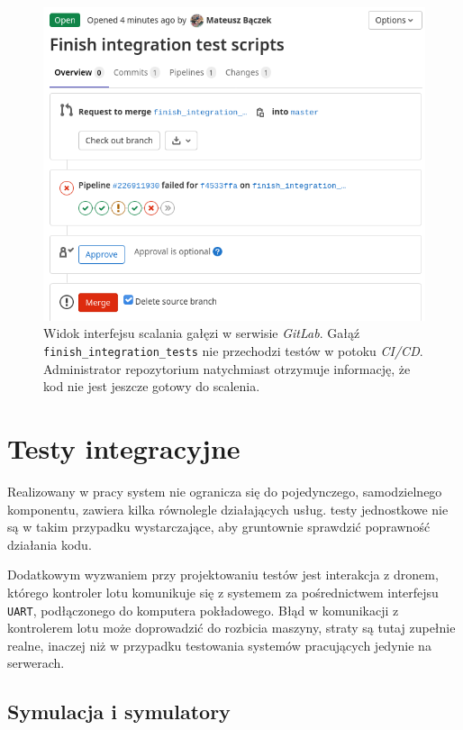 \begin{figure}[H]
	\centering
	\includegraphics[width=0.8\linewidth]{rys05/failed_pipeline.png}
    \caption{
        Widok interfejsu scalania gałęzi w serwisie \textit{GitLab}.
        Gałąź \texttt{finish\_integration\_tests} nie przechodzi testów
        w potoku \textit{CI/CD}. Administrator repozytorium natychmiast
        otrzymuje informację, że kod nie jest jeszcze gotowy do scalenia.
    }
	\label{failed_pipeline}
\end{figure}


\section{Testy integracyjne}

Realizowany w pracy system nie ogranicza się do pojedynczego,
samodzielnego komponentu, zawiera kilka równolegle działających
usług. testy jednostkowe nie są w takim przypadku wystarczające,
aby gruntownie sprawdzić poprawność działania kodu. 

Dodatkowym wyzwaniem przy projektowaniu testów jest interakcja z dronem,
którego kontroler lotu komunikuje się z systemem za pośrednictwem 
interfejsu \texttt{UART}, podłączonego do komputera pokładowego.
Błąd w komunikacji z kontrolerem lotu może doprowadzić do 
rozbicia maszyny, straty są tutaj zupełnie realne, inaczej
niż w przypadku testowania systemów pracujących jedynie na serwerach. 

\subsection{
    Symulacja i symulatory
    \color{white}\cite{simulation_and_simulacra}}

